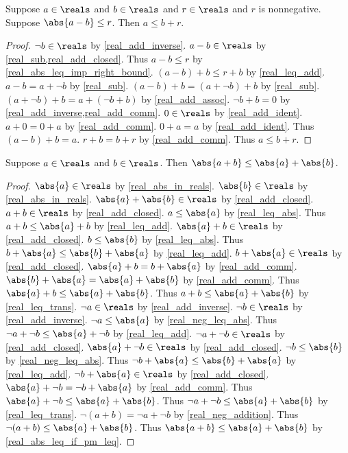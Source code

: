 \begin{theorem}\label{real_abs_sub_leq_imp_right_bound}
    Suppose $a\in\reals$ and $b\in\reals$ and $r\in\reals$ and $r$ is nonnegative.
    Suppose $\abs{a - b} \leq r$.
    Then $a \leq b + r$.
\end{theorem}
\begin{proof}
    $\neg{b}\in\reals$ by \cref{real_add_inverse}.
    $a - b\in\reals$ by \cref{real_sub,real_add_closed}.
    Thus $a - b \leq r$ by \cref{real_abs_leq_imp_right_bound}.
    $(a - b) + b \leq r + b$ by \cref{real_leq_add}.
    $a - b = a + \neg{b}$ by \cref{real_sub}.
    $(a - b) + b = (a + \neg{b}) + b$ by \cref{real_sub}.
    $(a + \neg{b}) + b = a + (\neg{b} + b)$ by \cref{real_add_assoc}.
    $\neg{b} + b = 0$ by \cref{real_add_inverse,real_add_comm}.
    $0\in\reals$ by \cref{real_add_ident}.
    $a + 0 = 0 + a$ by \cref{real_add_comm}.
    $0 + a = a$ by \cref{real_add_ident}.
    Thus $(a - b) + b = a$.
    $r + b = b + r$ by \cref{real_add_comm}.
    Thus $a \leq b + r$.
\end{proof}

\begin{theorem}\label{real_triangle_inequality}
    Suppose $a\in\reals$ and $b\in\reals$.
    Then $\abs{a + b} \leq \abs{a} + \abs{b}$.
\end{theorem}
\begin{proof}
    $\abs{a}\in\reals$ by \cref{real_abs_in_reals}.
    $\abs{b}\in\reals$ by \cref{real_abs_in_reals}.
    $\abs{a} + \abs{b}\in\reals$ by \cref{real_add_closed}.
    $a + b\in\reals$ by \cref{real_add_closed}.
    $a \leq \abs{a}$ by \cref{real_leq_abs}.
    Thus $a + b \leq \abs{a} + b$ by \cref{real_leq_add}.
    $\abs{a} + b\in\reals$ by \cref{real_add_closed}.
    $b \leq \abs{b}$ by \cref{real_leq_abs}.
    Thus $b + \abs{a} \leq \abs{b} + \abs{a}$ by \cref{real_leq_add}.
    $b + \abs{a}\in\reals$ by \cref{real_add_closed}.
    $\abs{a} + b = b + \abs{a}$ by \cref{real_add_comm}.
    $\abs{b} + \abs{a} = \abs{a} + \abs{b}$ by \cref{real_add_comm}.
    Thus $\abs{a} + b \leq \abs{a} + \abs{b}$.
    Thus $a + b \leq \abs{a} + \abs{b}$ by \cref{real_leq_trans}.
    $\neg{a}\in\reals$ by \cref{real_add_inverse}.
    $\neg{b}\in\reals$ by \cref{real_add_inverse}.
    $\neg{a} \leq \abs{a}$ by \cref{real_neg_leq_abs}.
    Thus $\neg{a} + \neg{b} \leq \abs{a} + \neg{b}$ by \cref{real_leq_add}.
    $\neg{a} + \neg{b}\in\reals$ by \cref{real_add_closed}.
    $\abs{a} + \neg{b}\in\reals$ by \cref{real_add_closed}.
    $\neg{b} \leq \abs{b}$ by \cref{real_neg_leq_abs}.
    Thus $\neg{b} + \abs{a} \leq \abs{b} + \abs{a}$ by \cref{real_leq_add}.
    $\neg{b} + \abs{a}\in\reals$ by \cref{real_add_closed}.
    $\abs{a} + \neg{b} = \neg{b} + \abs{a}$ by \cref{real_add_comm}.
    Thus $\abs{a} + \neg{b} \leq \abs{a} + \abs{b}$.
    Thus $\neg{a} + \neg{b} \leq \abs{a} + \abs{b}$ by \cref{real_leq_trans}.
    $\neg{(a + b)} = \neg{a} + \neg{b}$ by \cref{real_neg_addition}.
    Thus $\neg{(a + b)} \leq \abs{a} + \abs{b}$.
    Thus $\abs{a + b} \leq \abs{a} + \abs{b}$ by \cref{real_abs_leq_if_pm_leq}.
\end{proof}

